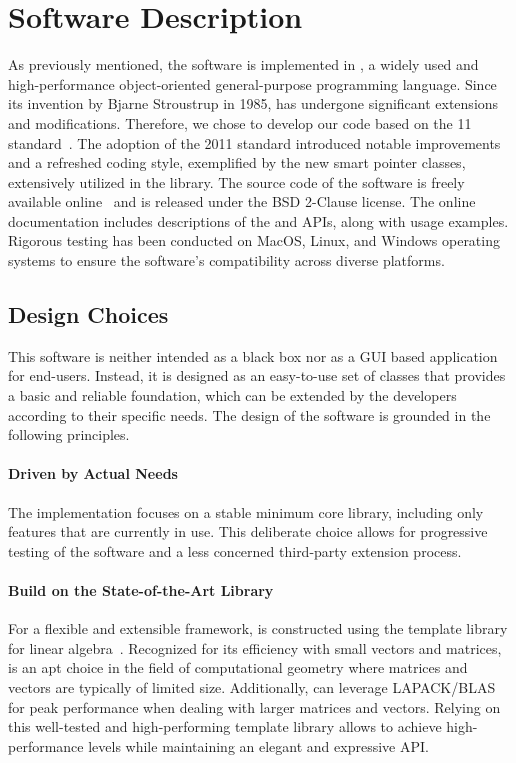 
\section{Software Description}

As previously mentioned, the software is implemented in \cpp{}, a widely used and high-performance object-oriented general-purpose programming language. Since its invention by Bjarne Stroustrup in 1985, \cpp{} has undergone significant extensions and modifications. Therefore, we chose to develop our code based on the \cpp{}11 standard~\cite{stroustrup2013cpp}. The adoption of the 2011 standard introduced notable improvements and a refreshed coding style, exemplified by the new smart pointer classes, extensively utilized in the \Acme{} library. The source code of the software is freely available online~\cite{acme} and is released under the \ac{BSD} 2-Clause license. The online documentation includes descriptions of the \cpp{} and \Matlab{} \Mex{} \acp{API}, along with usage examples. Rigorous testing has been conducted on MacOS, Linux, and Windows operating systems to ensure the software's compatibility across diverse platforms.

\subsection{Design Choices}

This software is neither intended as a black box nor as a \ac{GUI} based application for end-users. Instead, it is designed as an easy-to-use set of \cpp{} classes that provides a basic and reliable foundation, which can be extended by the developers according to their specific needs. The design of the software is grounded in the following principles.

\paragraph{Driven by Actual Needs}
The implementation focuses on a stable minimum core library, including only features that are currently in use. This deliberate choice allows for progressive testing of the software and a less concerned third-party extension process.

\paragraph{Build on the State-of-the-Art \Eigen{} Library}
For a flexible and extensible framework, \Acme{} is constructed using the \Eigen{} template library for linear algebra~\cite{eigen2010eigen}. Recognized for its efficiency with small vectors and matrices, \Eigen{} is an apt choice in the field of computational geometry where matrices and vectors are typically of limited size. Additionally, \Eigen{} can leverage \ac{LAPACK}/\ac{BLAS}~\cite{anderson1999lapack} for peak performance when dealing with larger matrices and vectors. Relying on this well-tested and high-performing template library allows \Acme{} to achieve high-performance levels while maintaining an elegant and expressive \ac{API}.

